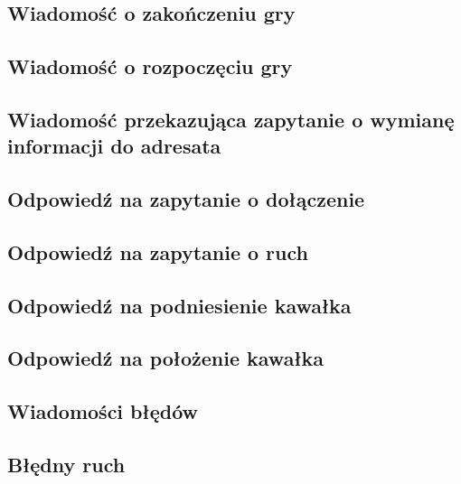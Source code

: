 \documentclass[Dokumentacja.tex]{subfiles}
\begin{document}
\subsection{Wiadomość o zakończeniu gry}


\subsection{Wiadomość o rozpoczęciu gry}


\subsection{Wiadomość przekazująca zapytanie o wymianę informacji do adresata}


\subsection{Odpowiedź na zapytanie o dołączenie}


\subsection{Odpowiedź na zapytanie o ruch}


\subsection{Odpowiedź na podniesienie kawałka}


\subsection{Odpowiedź na położenie kawałka}


\subsection{Wiadomości błędów}

\subsection{Błędny ruch}

\end{document}
